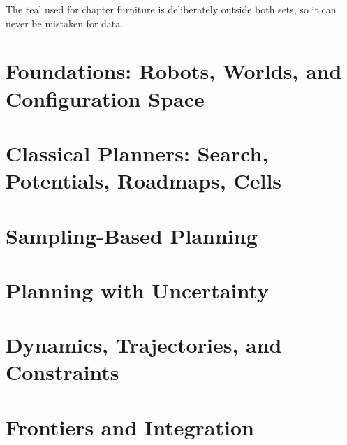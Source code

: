 \documentclass[11pt, twoside, openright]{book}
\begin{document}
\shcolorkey

\noindent
The teal used for chapter furniture is deliberately outside both sets, so it can
never be mistaken for data.

\cleardoublepage
\setcounter{tocdepth}{0}
\renewcommand{\contentsname}{Contents}
\tableofcontents

\mainmatter

\part{Foundations: Robots, Worlds, and Configuration Space}






\part{Classical Planners: Search, Potentials, Roadmaps, Cells}






\part{Sampling-Based Planning}





\part{Planning with Uncertainty}



\part{Dynamics, Trajectories, and Constraints}






\part{Frontiers and Integration}


\end{document}
